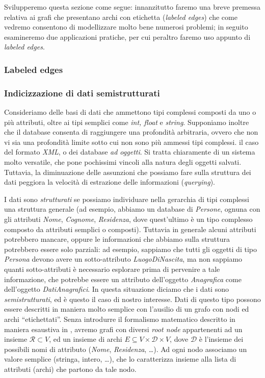 Svilupperemo questa sezione come segue: innanzitutto faremo una breve premessa relativa ai grafi che presentano archi con etichetta (\emph{labeled edges}) che come vedremo consentono di modellizzare molto bene numerosi problemi; in seguito esamineremo due applicazioni pratiche, per cui peraltro faremo uso appunto di \emph{labeled edges}.

\subsubsection{Labeled edges}

\subsubsection{Indicizzazione di dati semistrutturati}
Consideriamo delle basi di dati che ammettono tipi complessi composti da uno o più attributi, oltre ai tipi semplici come \emph{int, float} e \emph{string}. Supponiamo inoltre che il database consenta di raggiungere una profondità arbitraria, ovvero che non vi sia una profondità limite sotto cui non sono più ammessi tipi complessi. \accente il caso del formato \emph{XML}, o dei database \emph{ad oggetti}. Si tratta chiaramente di un sistema molto versatile, che pone pochissimi vincoli alla natura degli oggetti salvati. Tuttavia, la diminuazione delle assunzioni che possiamo fare sulla struttura dei dati peggiora la velocità di estrazione delle informazioni (\emph{querying}).

I dati sono \emph{strutturati} se possiamo individuare nella gerarchia di tipi complessi una struttura generale (ad esempio, abbiamo un database di \emph{Persone}, ognuna con gli attributi \emph{Nome}, \emph{Cognome}, \emph{Residenza}, dove quest'ultimo è un tipo complesso composto da attributi semplici o composti). Tuttavia in generale alcuni attributi potrebbero mancare, oppure le informazioni che abbiamo sulla struttura potrebbero essere solo parziali: ad esempio, sappiamo che tutti gli oggetti di tipo \emph{Persona} devono avere un sotto-attributo \emph{LuogoDiNascita}, ma non sappiamo quanti sotto-attributi è necessario esplorare prima di pervenire a tale informazione, che potrebbe essere un attributo dell'oggetto \emph{Anagrafica} come dell'oggetto \emph{DatiAnagrafici}. In questa situazione diciamo che i dati sono \emph{semistrutturati}, ed è questo il caso di nostro interesse. Dati di questo tipo possono essere descritti in maniera molto semplice con l'ausilio di un grafo con nodi ed archi ``etichettati''. Senza introdurre il formalismo matematico descritto in maniera esaustiva in \cite{milo}, avremo grafi con diversi \emph{root node} appartenenti ad un insieme $\mathcal{R} \subset V$, ed un insieme di archi $E \subseteq V \times \mathcal{D} \times V$, dove $\mathcal{D}$ è l'insieme dei possibili nomi di attributo (\emph{Nome}, \emph{Residenza}, \dots). Ad ogni nodo associamo un valore semplice (stringa, intero, \dots), che lo caratterizza insieme alla lista di attributi (archi) che partono da tale nodo.

